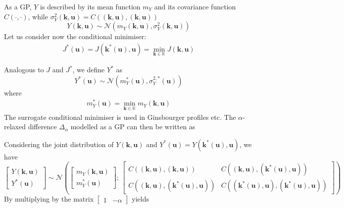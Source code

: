 \documentclass[a4paper,11pt]{article}
\newcommand{\Kspace}{\mathbb{K}}
\theoremstyle{defi}
\numberwithin{thmCounter}{section}
\begin{document}
As a GP, $Y$ is described by its mean function $m_{Y}$ and its covariance function $C(\cdot, \cdot)$, while $\sigma^2_Y(\mathbf{k},\mathbf{u}) = C((\mathbf{k},\mathbf{u}), (\mathbf{k},\mathbf{u}))$
\begin{equation}
  Y(\mathbf{k},\mathbf{u}) \sim \mathcal{N}\left(m_{Y}(\mathbf{k},\mathbf{u}), \sigma^2_Y(\mathbf{k},\mathbf{u}) \right)
\end{equation}
Let us consider now the conditional minimiser:
\begin{align}
  J^*(\mathbf{u}) = J(\mathbf{k}^*(\mathbf{u}),\mathbf{u}) = \min_{\mathbf{k}\in\Kspace} J(\mathbf{k},\mathbf{u})
\end{align}

Analogous to $J$ and $J^*$, we define $Y^*$ as
\begin{equation}
  Y^*(\mathbf{u}) \sim \mathcal{N}\left(m^*_Y(\mathbf{u}), \sigma^{2,*}_Y(\mathbf{u})\right)
\end{equation}
where
\begin{align}
  m^*_Y(\mathbf{u}) = \min_{\mathbf{k}\in\Kspace} m_Y(\mathbf{k},\mathbf{u})
\end{align}
The surrogate conditional minimiser is used in Ginsbourger profiles etc.
The $\alpha$-relaxed difference  $\Delta_{\alpha}$ modelled as a GP can then be written as

Considering the joint distribution of $Y(\mathbf{k},\mathbf{u})$ and $Y^*(\mathbf{u}) = Y(\mathbf{k}^*(\mathbf{u}), \mathbf{u})$, we have
\begin{equation}
  \begin{bmatrix}
    Y(\mathbf{k},\mathbf{u}) \\
    Y^*(\mathbf{u})
  \end{bmatrix}
  \sim \mathcal{N}\left(
    \begin{bmatrix}
      m_Y(\mathbf{k},\mathbf{u}) \\
      m_Y^*(\mathbf{u})
    \end{bmatrix}
    ;\,
    \begin{bmatrix}
      C\left((\mathbf{k},\mathbf{u}),(\mathbf{k},\mathbf{u})\right) & C\left((\mathbf{k},\mathbf{u}),(\mathbf{k}^*(\mathbf{u}),\mathbf{u})\right) \\
      C\left((\mathbf{k},\mathbf{u}),(\mathbf{k}^*(\mathbf{u}),\mathbf{u})\right) & C\left((\mathbf{k}^*(\mathbf{u}),\mathbf{u}),(\mathbf{k}^*(\mathbf{u}),\mathbf{u})\right)
    \end{bmatrix}
\right)
\end{equation}
By multiplying by the matrix $\begin{bmatrix}1 & -\alpha \end{bmatrix}$ yields
\end{document}
